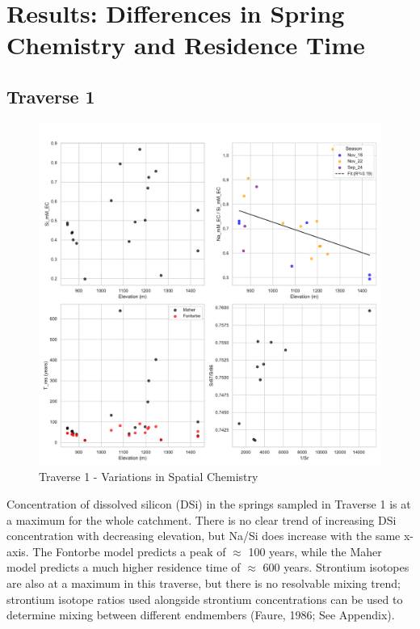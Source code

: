 
\section{Results: Differences in Spring Chemistry and Residence Time}

\subsection{Traverse 1}

\begin{figure}[h]
    \centering
        \includegraphics[width=\textwidth]{Traverse_1_summary.pdf}
    \caption{Traverse 1 - Variations in Spatial Chemistry}
    \label{fig:spatial_changes_spring1}
\end{figure}

\FloatBarrier

Concentration of dissolved silicon (DSi) in the springs sampled in Traverse 1 is at a maximum for the whole catchment. There is no clear trend of increasing DSi concentration with decreasing elevation, but Na/Si does increase with the same x-axis. The Fontorbe model predicts a peak of $\approx$ 100 years, while the Maher model predicts a much higher residence time of $\approx$ 600 years. Strontium isotopes are also at a maximum in this traverse, but there is no resolvable mixing trend; strontium isotope ratios used alongside strontium concentrations can be used to determine mixing between different endmembers (Faure, 1986; See Appendix).



